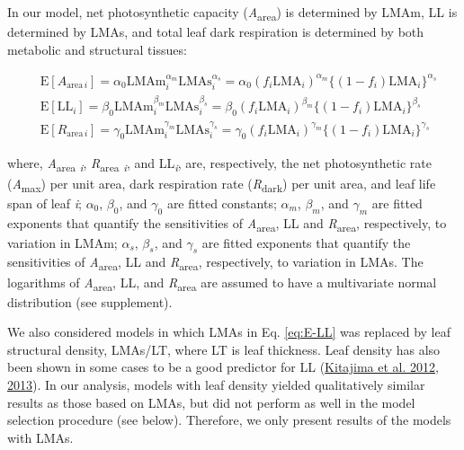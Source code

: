 \documentclass[
  12pt,
]{article}
\begin{document}
In our model, net photosynthetic capacity (\emph{A}\textsubscript{area}) is determined by LMAm, LL is determined by LMAs, and total leaf dark respiration is determined by both metabolic and structural tissues:

\begin{align}
& \mathrm{E}[A_{\mathrm{area} \, i}]
= \alpha_0\mathrm{LMAm}_{i}^{\alpha_m}\mathrm{LMAs}_i^{\alpha_s}  =  \alpha_0 (f_i \mathrm{LMA}_{i})^{\alpha_m} \bigl\{(1-f_i) \mathrm{LMA}_{i}\bigr\}^{\alpha_s} \label{eq:E-A} \\
& \mathrm{E}[\mathrm{LL}_i] = \beta_0\mathrm{LMAm}_{i}^{\beta_m} \mathrm{LMAs}_{i}^{\beta_s}   = \beta_0 (f_i \mathrm{LMA}_{i})^{\beta_m} \bigl\{(1-f_i) \mathrm{LMA}_{i}\bigr\}^{\beta_s} \label{eq:E-LL} \\
& \mathrm{E}[R_{\mathrm{area} \, i}]
= \gamma_0\mathrm{LMAm}_{i}^{\gamma_m} \mathrm{LMAs}_{i}^{\gamma_s}
= \gamma_0 (f_i \mathrm{LMA}_{i})^{\gamma_m} \bigl\{(1-f_i)\mathrm{LMA}_{i}\bigr\}^{\gamma_s} \label{eq:E-R}
\end{align}

where, \emph{A}\textsubscript{area} \textsubscript{\emph{i}}, \emph{R}\textsubscript{area} \textsubscript{\emph{i}}, and LL\textsubscript{\emph{i}}, are, respectively, the net photosynthetic rate (\emph{A}\textsubscript{max}) per unit area, dark respiration rate (\emph{R}\textsubscript{dark}) per unit area, and leaf life span of leaf \emph{i}; \(\alpha_0\), \(\beta_0\), and \(\gamma_0\) are fitted constants; \(\alpha_m\), \(\beta_m\), and \(\gamma_m\) are fitted exponents that quantify the sensitivities of \emph{A}\textsubscript{area}, LL and \emph{R}\textsubscript{area}, respectively, to variation in LMAm; \(\alpha_s\), \(\beta_s\), and \(\gamma_s\) are fitted exponents that quantify the sensitivities of \emph{A}\textsubscript{area}, LL and \emph{R}\textsubscript{area}, respectively, to variation in LMAs.
The logarithms of \emph{A}\textsubscript{area}, LL, and \emph{R}\textsubscript{area} are assumed to have a multivariate normal distribution (see supplement).

We also considered models in which LMAs in Eq. \eqref{eq:E-LL} was replaced by leaf structural density, LMAs/LT, where LT is leaf thickness.
Leaf density has also been shown in some cases to be a good predictor for LL (\protect\hyperlink{ref-Kitajima2012}{Kitajima et al. 2012}, \protect\hyperlink{ref-Kitajima2013}{2013}).
In our analysis, models with leaf density yielded qualitatively similar results as those based on LMAs, but did not perform as well in the model selection procedure (see below).
Therefore, we only present results of the models with LMAs.
\end{document}
